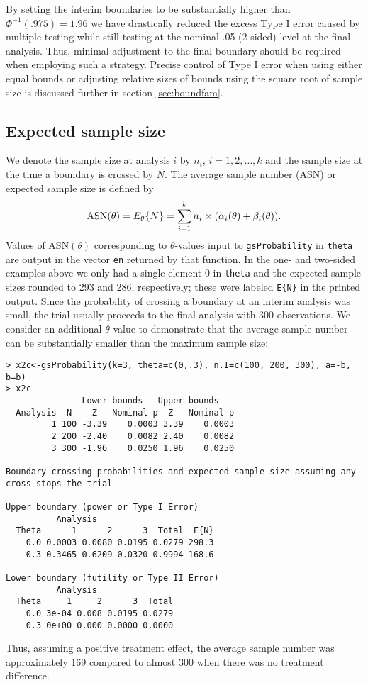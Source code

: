 By setting the interim boundaries to be substantially higher than $\Phi^{-1}(.975)=1.96$ we have drastically reduced the excess Type I error caused by multiple testing while still testing at the nominal .05 (2-sided) level at the final analysis. Thus, minimal adjustment to the final boundary should be required when employing such a strategy.
Precise control of Type I error when using either equal bounds or adjusting relative sizes of bounds using the square root of sample size is discussed further in section \ref{sec:boundfam}. 

\subsection{Expected sample size\label{sec:ASN}}
We denote the sample size at analysis $i$ by $n_i$, $i=1,2,\ldots,k$ and the sample size at the time a boundary is crossed by $N$. 
The average sample number (ASN) or expected sample size is defined by
\begin{equation}
\hbox{ASN}(\theta)=E_\theta \{N\}=\sum_{i=1}^k n_i\times(\alpha_i(\theta)+\beta_i(\theta)).\label{eqn:ASN}
\end{equation}
Values of ASN$(\theta)$ corresponding to $\theta$-values input to \texttt{gsProbability} in \texttt{theta} are output in the vector \texttt{en} returned by that function. In the one- and two-sided examples above we only had a single element 0 in \texttt{theta} and the expected sample sizes rounded to 293 and 286, respectively; these were labeled \texttt{E\{N\}} in the printed output. Since the probability of crossing a boundary at an interim analysis was small, the trial usually proceeds to the final analysis with 300 observations. We consider an additional $\theta$-value to demonstrate that the average sample number can be substantially smaller than the maximum sample size:
\begin{verbatim}
> x2c<-gsProbability(k=3, theta=c(0,.3), n.I=c(100, 200, 300), a=-b, b=b)
> x2c
               Lower bounds   Upper bounds
  Analysis  N    Z   Nominal p  Z   Nominal p
         1 100 -3.39    0.0003 3.39    0.0003
         2 200 -2.40    0.0082 2.40    0.0082
         3 300 -1.96    0.0250 1.96    0.0250

Boundary crossing probabilities and expected sample size assuming any cross stops the trial

Upper boundary (power or Type I Error)
          Analysis
  Theta      1      2      3  Total  E{N}
    0.0 0.0003 0.0080 0.0195 0.0279 298.3
    0.3 0.3465 0.6209 0.0320 0.9994 168.6

Lower boundary (futility or Type II Error)
          Analysis
  Theta     1     2      3  Total
    0.0 3e-04 0.008 0.0195 0.0279
    0.3 0e+00 0.000 0.0000 0.0000
\end{verbatim}
Thus, assuming a positive treatment effect, the average sample number was approximately 169 compared to almost 300 when there was no treatment difference.
